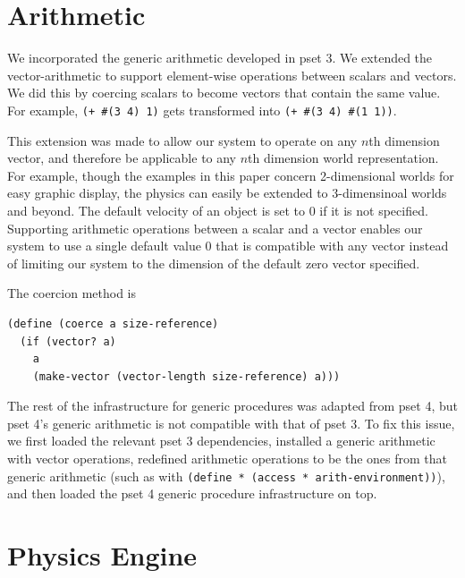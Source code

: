 \documentclass{article}
\begin{document}



\section{Arithmetic}

We incorporated the generic arithmetic developed in pset 3. We extended the
vector-arithmetic to support element-wise operations between scalars and
vectors. We did this by coercing scalars to become vectors that contain the
same value. For example, \texttt{(+ \#(3 4) 1)} gets transformed into
\texttt{(+ \#(3 4) \#(1 1))}.

This extension was made to allow our system to operate on any $n$th dimension
vector, and therefore be applicable to any $n$th dimension world
representation. For example, though the examples in this paper concern
2-dimensional worlds for easy graphic display, the physics can easily be
extended to 3-dimensinoal worlds and beyond. The default velocity of an object
is set to 0 if it is not specified. Supporting arithmetic operations between a
scalar and a vector enables our system to use a single default value 0 that is
compatible with any vector instead of limiting our system to the dimension of
the default zero vector specified.

The coercion method is
\begin{verbatim}
(define (coerce a size-reference)
  (if (vector? a)
    a
    (make-vector (vector-length size-reference) a)))
\end{verbatim}

The rest of the infrastructure for generic procedures was adapted from pset 4,
but pset 4's generic arithmetic is not compatible with that of pset 3. To fix
this issue, we first loaded the relevant pset 3 dependencies, installed a
generic arithmetic with vector operations, redefined arithmetic operations to
be the ones from that generic arithmetic (such as with \texttt{(define *
(access * arith-environment))}), and then loaded the pset 4 generic procedure
infrastructure on top.

\section{Physics Engine}
\end{document}
